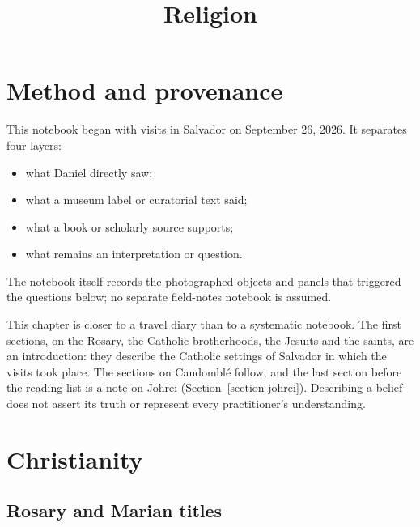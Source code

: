 



\title{Religion}
\maketitle

\label{section-phantom}

\tableofcontents

\section{Method and provenance}
\label{religion-section-religion-method}

This notebook began with visits in
Salvador on September 26, 2026.  It
separates four layers:

\begin{itemize}
\item what Daniel directly saw;
\item what a museum label or curatorial
text said;
\item what a book or scholarly source
supports;
\item what remains an interpretation or
question.
\end{itemize}

The notebook itself records the photographed
objects and panels that triggered the
questions below; no separate field-notes
notebook is assumed.

This chapter is closer to a travel diary
than to a systematic notebook. The first
sections, on the Rosary, the Catholic
brotherhoods, the Jesuits and the saints,
are an introduction: they describe the
Catholic settings of Salvador in which
the visits took place. The sections on
Candombl\'e follow, and the last section
before the reading list is a note on Johrei
(Section~\ref{section-johrei}). Describing
a belief does not assert its truth or
represent every practitioner's
understanding.

\section{Christianity}
\label{section-christianity}

\subsection{Rosary and Marian titles}
\label{religion-section-rosary-marian-titles}

